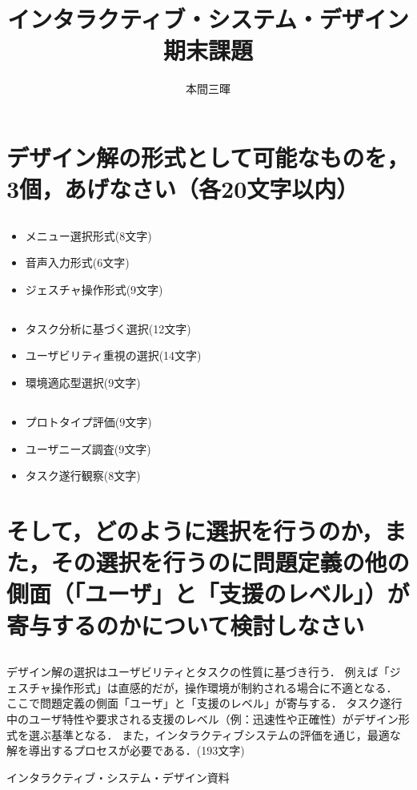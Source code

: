 \documentclass[titlepage,a4paper]{jsarticle}
\title{インタラクティブ・システム・デザイン期末課題}
\author{本間三暉}
\renewcommand{\thesubsection}{\thesection-\arabic{subsection})}
\begin{document}
\maketitle

\section{デザイン解の形式として可能なものを，3個，あげなさい（各20文字以内）}
\subsection{ }
\begin{itemize}
  \item メニュー選択形式(8文字)
  \item 音声入力形式(6文字)
  \item ジェスチャ操作形式(9文字)
\end{itemize}

\subsection{ }
\begin{itemize}
  \item タスク分析に基づく選択(12文字)
  \item ユーザビリティ重視の選択(14文字)
  \item 環境適応型選択(9文字)
\end{itemize}

\subsection{ }
\begin{itemize}
  \item プロトタイプ評価(9文字)
  \item ユーザニーズ調査(9文字)
  \item タスク遂行観察(8文字)
\end{itemize}

\section{そして，どのように選択を行うのか，また，その選択を行うのに問題定義の他の側面（「ユーザ」と「支援のレベル」）が寄与するのかについて検討しなさい}
\renewcommand{\thesubsection}{\thesection)}
\subsection{ }
デザイン解の選択はユーザビリティとタスクの性質に基づき行う．
例えば「ジェスチャ操作形式」は直感的だが，操作環境が制約される場合に不適となる．
ここで問題定義の側面「ユーザ」と「支援のレベル」が寄与する．
タスク遂行中のユーザ特性や要求される支援のレベル（例：迅速性や正確性）がデザイン形式を選ぶ基準となる．
また，インタラクティブシステムの評価を通じ，最適な解を導出するプロセスが必要である．(193文字)
\begin{thebibliography}{99}
  インタラクティブ・システム・デザイン資料
\end{thebibliography}
\end{document}
